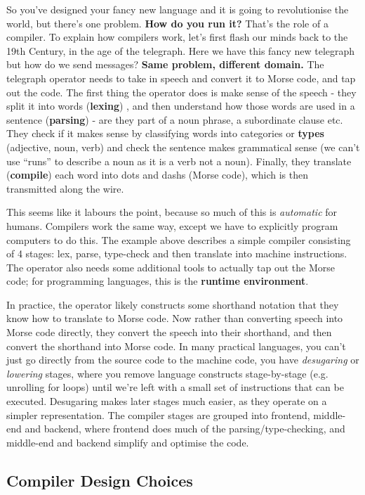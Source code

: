 So you've designed your fancy new language and it is going to
revolutionise the world, but there's one problem. \textbf{How do you run
it?} That's the role of a compiler. To explain how compilers work, let's
first flash our minds back to the 19th Century, in the age of the
telegraph. Here we have this fancy new telegraph but how do we send
messages? \textbf{Same problem, different domain.} The telegraph
operator needs to take in speech and convert it to Morse code, and tap
out the code. The first thing the operator does is make sense of the
speech - they split it into words (\textbf{lexing}) , and then
understand how those words are used in a sentence (\textbf{parsing}) -
are they part of a noun phrase, a subordinate clause etc. They check if
it makes sense by classifying words into categories or \textbf{types}
(adjective, noun, verb) and check the sentence makes grammatical sense
(we can't use ``runs'' to describe a noun as it is a verb not a noun).
Finally, they translate (\textbf{compile}) each word into dots and dashs
(Morse code), which is then transmitted along the wire.

This seems like it labours the point, because so much of this is
\emph{automatic} for humans. Compilers work the same way, except we have
to explicitly program computers to do this. The example above describes
a simple compiler consisting of 4 stages: lex, parse, type-check and
then translate into machine instructions. The operator also needs some
additional tools to actually tap out the Morse code; for programming
languages, this is the \textbf{runtime environment}.

In practice, the operator likely constructs some shorthand notation that
they know how to translate to Morse code. Now rather than converting
speech into Morse code directly, they convert the speech into their
shorthand, and then convert the shorthand into Morse code. In many
practical languages, you can't just go directly from the source code to
the machine code, you have \emph{desugaring} or \emph{lowering} stages,
where you remove language constructs stage-by-stage (e.g. unrolling for
loops) until we're left with a small set of instructions that can be
executed. Desugaring makes later stages much easier, as they operate on
a simpler representation. The compiler stages are grouped into frontend,
middle-end and backend, where frontend does much of the
parsing/type-checking, and middle-end and backend simplify and optimise
the code.

\hypertarget{compiler-design-choices}{%
\subsection{\texorpdfstring{\protect\hyperlink{compiler-design-choices}{}Compiler
Design
Choices}{Compiler Design Choices}}\label{compiler-design-choices}}

